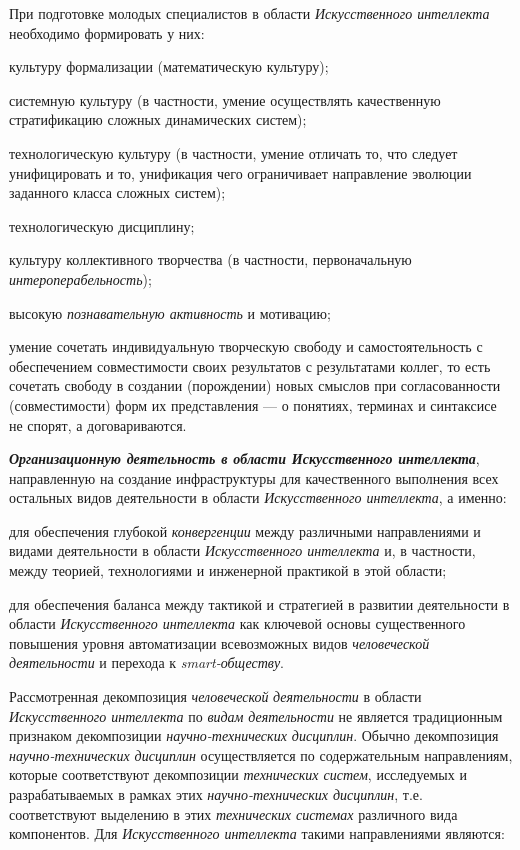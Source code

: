 \begin{textitemize}
	При подготовке молодых специалистов в области \textit{Искусственного интеллекта} необходимо формировать у них:
	\begin{textitemize}
		\item культуру формализации (математическую культуру);
		\item системную культуру (в частности, умение осуществлять качественную стратификацию сложных динамических систем);
		\item технологическую культуру (в частности, умение отличать то, что следует унифицировать и то, унификация чего ограничивает направление эволюции заданного класса сложных систем);
		\item технологическую дисциплину;
		\item культуру коллективного творчества (в частности, первоначальную \textit{интероперабельность});
		\item высокую \textit{познавательную активность} и мотивацию;
		\item умение сочетать индивидуальную творческую свободу и самостоятельность с обеспечением совместимости своих результатов с результатами коллег, то есть сочетать свободу в создании (порождении) новых смыслов при согласованности (совместимости) форм их представления --- о понятиях, терминах и синтаксисе не спорят, а договариваются.
	\end{textitemize}
	
	\item
	\textbf{\textit{Организационную деятельность в области Искусственного интеллекта}}, направленную на создание инфраструктуры для качественного выполнения всех остальных видов деятельности в области \textit{Искусственного интеллекта}, а именно:
	\begin{textitemize}
		\item
		для обеспечения глубокой \textit{конвергенции} между различными направлениями и видами деятельности в области \textit{Искусственного интеллекта} и, в частности, между теорией, технологиями и инженерной практикой в этой области;
		\item
		для обеспечения баланса между тактикой и стратегией в развитии деятельности в области \textit{Искусственного интеллекта} как ключевой основы существенного повышения уровня автоматизации всевозможных видов \textit{человеческой деятельности} и перехода к \textit{smart-обществу}.
	\end{textitemize}
\end{textitemize}

Рассмотренная декомпозиция \textit{человеческой} \textit{деятельности} в области \textit{Искусственного интеллекта} по \textit{видам} \textit{деятельности} не является традиционным признаком декомпозиции \textit{научно-технических дисциплин}. Обычно декомпозиция \textit{научно-технических дисциплин} осуществляется по содержательным направлениям, которые соответствуют декомпозиции \textit{технических систем}, исследуемых и разрабатываемых в рамках этих \textit{научно-технических дисциплин}, т.е. соответствуют выделению в этих \textit{технических системах} различного вида компонентов. Для \textit{Искусственного интеллекта} такими направлениями являются:

